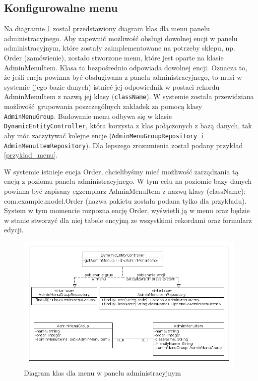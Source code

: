 \subsection{Konfigurowalne menu}
Na diagramie \ref{klasy_menu} został przedstawiony diagram klas dla menu panelu administracyjnego. Aby zapewnić możliwość obsługi dowolnej encji w panelu administracyjnym, które zostały zaimplementowane na potrzeby sklepu, np. Order (zamówienie), zostało stworzone menu, które jest oparte na klasie AdminMenuItem. Klasa ta bezpośrednio odpowiada dowolnej encji. Oznacza to, że jeśli encja powinna być obsługiwana z panelu administracyjnego, to musi w systemie (jego bazie danych) istnieć jej odpowiednik w postaci rekordu AdminMenuItem z nazwą jej klasy (\texttt{className}). W systemie została przewidziana możliwość grupowania poszczególnych zakładek za pomocą klasy \texttt{AdminMenuGroup}. Budowanie menu odbywa się w klasie \texttt{DynamicEntityController}, która korzysta z klas połączonych z bazą danych, tak aby móc zaczytywać kolejne encje (\texttt{AdminMenuGroupRepository i AdminMenuItemRepository}). Dla lepszego zrozumienia został podany przykład \ref{przyklad_menu}.
\begin{example}
	W systemie istnieje encja Order, chcielibyśmy mieć możliwość zarządzania tą encją z poziomu panelu administracyjnego. W tym celu na poziomie bazy danych powinna być zapisany egzemplarz AdminMenuItem z nazwą klasy (className): com.example.model.Order (nazwa pakietu została podana tylko dla przykładu). System w tym momencie rozpozna encję Order, wyświetli ją w menu oraz będzie w stanie stworzyć dla niej tabele encyjną ze wszystkimi rekordami oraz formularz edycji. 
\end{example} 
\begin{figure}
	\begin{center}
		\includegraphics[scale=0.5]{klasy_menu.png}
	\end{center}
	\caption{{\color{black}Diagram klas dla menu w panelu administracyjnym}} \label{klasy_menu}
\end{figure}

